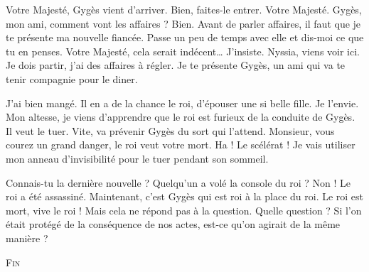 \documentclass[12pt, a5paper, french]{memoir}
\begin{document}
\begin{drama}
\scene

\StageDir{\G, \R, \r, \S}
\Sspeaks Votre Majesté, Gygès vient d’arriver.
\Rspeaks Bien, faites-le entrer.
\Gspeaks Votre Majesté.
\Rspeaks Gygès, mon ami, comment vont les affaires ?
\Gspeaks Bien.
\Rspeaks Avant de parler affaires, il faut que je te présente ma nouvelle fiancée. Passe un peu de temps avec elle et dis-moi ce que tu en penses.
\Gspeaks Votre Majesté, cela serait indécent\dots
\Rspeaks J’insiste.  Nyssia, viens voir ici. Je dois partir, j’ai des affaires à régler. Je te présente Gygès, un ami qui va te tenir compagnie pour le diner.

\scene

\StageDir{\G, \r, \s}
\Gspeaks {} J’ai bien mangé. Il en a de la chance le roi, d’épouser une si belle fille. Je l’envie.
\sspeaks {} Mon altesse, je viens d’apprendre que le roi est furieux de la conduite de Gygès. Il veut le tuer.
\rspeaks Vite, va prévenir Gygès du sort qui l’attend.
\sspeaks {} Monsieur, vous courez un grand danger, le roi veut votre mort.
\Gspeaks Ha ! Le scélérat ! Je vais utiliser mon anneau d’invisibilité pour le tuer pendant son sommeil.

\scene

\StageDir{\Vi, \Vj}
\Vispeaks Connais-tu la dernière nouvelle ?
\Vjspeaks Quelqu’un a volé la console du roi ?
\Vispeaks Non ! Le roi a été assassiné. Maintenant, c’est Gygès qui est roi à la place du roi.
\Vjspeaks Le roi est mort, vive le roi !
\Vispeaks Mais cela ne répond pas à la question.
\Vjspeaks Quelle question ?
\Vispeaks Si l’on était protégé de la conséquence de nos actes, est-ce qu’on agirait de la même manière ?
\end{drama}

\hfill
\centering

\textsc{Fin}
\end{document}
